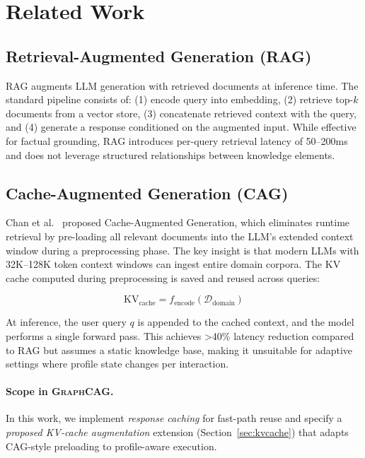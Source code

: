\documentclass[11pt,a4paper,twocolumn]{article}
\newcommand{\graphcag}{\textsc{GraphCAG}}
\begin{document}
\section{Related Work}
\label{sec:related}

\subsection{Retrieval-Augmented Generation (RAG)}

RAG \cite{lewis2020rag} augments LLM generation with retrieved documents at inference time. The standard pipeline consists of: (1) encode query into embedding, (2) retrieve top-$k$ documents from a vector store, (3) concatenate retrieved context with the query, and (4) generate a response conditioned on the augmented input. While effective for factual grounding, RAG introduces per-query retrieval latency of 50--200ms and does not leverage structured relationships between knowledge elements.

\subsection{Cache-Augmented Generation (CAG)}

Chan et al.\ \cite{chan2024cag} proposed Cache-Augmented Generation, which eliminates runtime retrieval by pre-loading all relevant documents into the LLM's extended context window during a preprocessing phase. The key insight is that modern LLMs with 32K--128K token context windows can ingest entire domain corpora. The KV cache computed during preprocessing is saved and reused across queries:

\begin{equation}
  \text{KV}_\text{cache} = f_\text{encode}(\mathcal{D}_\text{domain})
\end{equation}

At inference, the user query $q$ is appended to the cached context, and the model performs a single forward pass. This achieves \textgreater{}40\% latency reduction compared to RAG but assumes a static knowledge base, making it unsuitable for adaptive settings where profile state changes per interaction.

\paragraph{Scope in \graphcag{}.} In this work, we implement \emph{response caching} for fast-path reuse and specify a \emph{proposed KV-cache augmentation} extension (Section~\ref{sec:kvcache}) that adapts CAG-style preloading to profile-aware execution.
\end{document}
